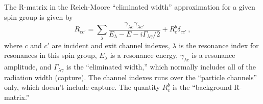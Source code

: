 The R-matrix in the Reich-Moore ``eliminated width''
 approximation for a given spin group is
given by
\begin{equation}
  R_{cc'}=\sum_\lambda \frac{\gamma_{\lambda c}\gamma_{\lambda c'}}
     {E_\lambda-E-i\Gamma_{\lambda\gamma}/2}
     +R_c^b\delta_{cc'}\,,
\label{rmtx}
\end{equation}
where $c$ and $c'$ are incident and exit channel indexes, $\lambda$
is the resonance index for resonances in this spin group,
$E_\lambda$ is a resonance energy, $\gamma_{\lambda c}$ is a
resonance amplitude, and $\Gamma_{\lambda\gamma}$ is the
``eliminated width,'' which normally includes all of the
radiation width (capture).  The channel indexes runs over the
``particle channels'' only, which doesn't include capture.
The quantity $R_c^b$ is the ``background R-matrix.''

